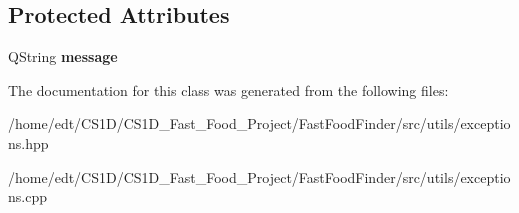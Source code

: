 \subsection*{Protected Attributes}
\begin{DoxyCompactItemize}
\item 
\hypertarget{classGeneralException_af3e4ac87c597353172d3c5ec621f4925}{Q\-String {\bfseries message}}\label{classGeneralException_af3e4ac87c597353172d3c5ec621f4925}

\end{DoxyCompactItemize}


The documentation for this class was generated from the following files\-:\begin{DoxyCompactItemize}
\item 
/home/edt/\-C\-S1\-D/\-C\-S1\-D\-\_\-\-Fast\-\_\-\-Food\-\_\-\-Project/\-Fast\-Food\-Finder/src/utils/exceptions.\-hpp\item 
/home/edt/\-C\-S1\-D/\-C\-S1\-D\-\_\-\-Fast\-\_\-\-Food\-\_\-\-Project/\-Fast\-Food\-Finder/src/utils/exceptions.\-cpp\end{DoxyCompactItemize}
